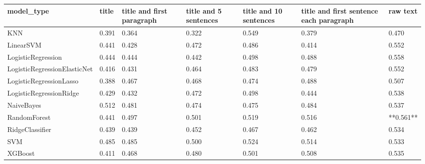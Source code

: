 \begin{tabular}{lllllll}
\toprule
                  model\_type & title & title and first paragraph & title and 5 sentences & title and 10 sentences & title and first sentence each paragraph &  raw text \\
\midrule
                         KNN & 0.391 &                     0.364 &                 0.322 &                  0.549 &                                   0.379 &     0.470 \\
                   LinearSVM & 0.441 &                     0.428 &                 0.472 &                  0.486 &                                   0.414 &     0.552 \\
          LogisticRegression & 0.444 &                     0.444 &                 0.442 &                  0.498 &                                   0.488 &     0.558 \\
LogisticRegressionElasticNet & 0.416 &                     0.431 &                 0.464 &                  0.483 &                                   0.479 &     0.552 \\
     LogisticRegressionLasso & 0.388 &                     0.467 &                 0.468 &                  0.474 &                                   0.488 &     0.507 \\
     LogisticRegressionRidge & 0.429 &                     0.432 &                 0.472 &                  0.498 &                                   0.444 &     0.538 \\
                  NaiveBayes & 0.512 &                     0.481 &                 0.474 &                  0.475 &                                   0.484 &     0.537 \\
                RandomForest & 0.441 &                     0.497 &                 0.501 &                  0.519 &                                   0.516 & **0.561** \\
             RidgeClassifier & 0.439 &                     0.439 &                 0.452 &                  0.467 &                                   0.462 &     0.534 \\
                         SVM & 0.485 &                     0.485 &                 0.500 &                  0.524 &                                   0.514 &     0.533 \\
                     XGBoost & 0.411 &                     0.468 &                 0.480 &                  0.501 &                                   0.508 &     0.535 \\
\bottomrule
\end{tabular}
